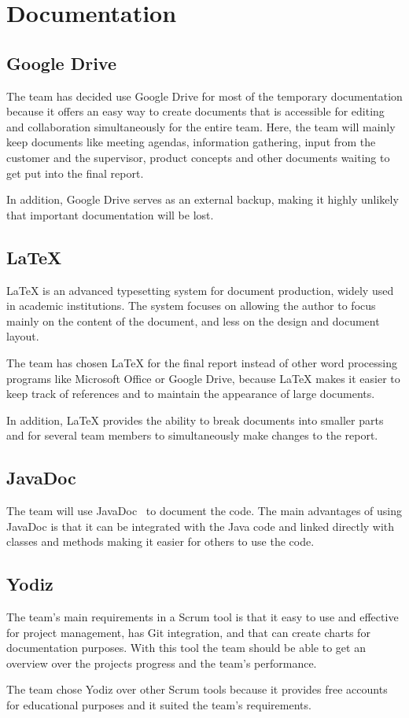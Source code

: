 \section{Documentation}

\subsection{Google Drive}
The team has decided use Google Drive for most of the temporary documentation because it offers an easy way to create documents that is accessible for editing and collaboration simultaneously for the entire team. Here, the team will mainly 
keep documents like meeting agendas, information gathering, input from the customer and the supervisor, product concepts and other documents waiting to get put into the final report. 

In addition, Google Drive serves as an external backup, making it highly unlikely that important documentation will be lost. 


\subsection{\LaTeX}
LaTeX is an advanced typesetting system for document production, widely used in
academic institutions. The system focuses on allowing the author to focus mainly on the content of the document, and less on the design and document layout.

The team has chosen LaTeX for the final report instead of other word processing programs like Microsoft Office or Google Drive, because LaTeX makes it easier to keep track of references and to maintain the appearance of large
documents. 

In addition, LaTeX provides the ability to break documents into smaller parts and for several team members to simultaneously make changes to the report.


\subsection{JavaDoc}
The team will use JavaDoc~\cite{javadoc} to document the code. The main advantages of using JavaDoc is that it can be integrated with the Java code and linked directly with classes and methods making it easier for others to use the code.

\subsection{Yodiz}
The team's main requirements in a Scrum tool is that it easy to use and effective for project management, has Git integration, and that can create charts for documentation purposes. With this tool the team should be able to get an overview over the projects progress and the team's performance. 

The team chose Yodiz over other Scrum tools because it provides 
free accounts for educational purposes and it suited the team's requirements. 